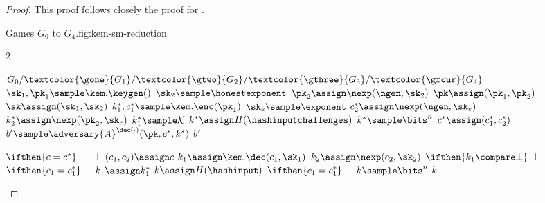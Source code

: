 \begin{proof}
    This proof follows closely the proof for \cite[Theorem 1]{PKC:GiaHeuPoe18}.

    \begin{gamefigure}{Games $G_0$ to $G_4$.}{fig:kem-sm-reduction}
        \begin{games}{2}
            \begin{gameenv}{\game $G_0 / \textcolor{\gone}{G_1} / \textcolor{\gtwo}{G_2} / \textcolor{\gthree}{G_3} / \textcolor{\gfour}{G_4}$}
                \State $\sk_1, \pk_1 \sample \kem.\keygen()$
                \State $\sk_2 \sample \honestexponent$
                \State $\pk_2 \assign \nexp(\ngen, \sk_2)$
                \State $\pk \assign (\pk_1, \pk_2)$
                \State $\sk \assign (\sk_1, \sk_2)$
                \State $k^*_1, c^*_1 \sample \kem.\enc(\pk_1)$
                \State $\sk_e \sample \exponent$
                \State $c^*_2 \assign \nexp(\ngen, \sk_e)$
                \State $k^*_2 \assign \nexp(\pk_2, \sk_e)$
                \BeginBox[draw=\gone]
                \State $k_1^* \sample \mathcal{K}$
                \EndBox
                \State $k^* \assign H(\hashinputchallenges)$
                \BeginBox[draw=\gtwo]
                \State  $k^* \sample \bits^{n}$
                \EndBox
                \State $c^* \assign (c_1^*, c_2^*)$
                \State $b' \sample \adversary{A}^{\dec(\cdot)}(\pk, c^*, k^*)$
                \State \Return $b'$
            \end{gameenv}
            \gamebreak
            \begin{gameenv}{\oracledec}
                \State $\ifthen{c = c^*}$
                    \State $\quad$ \Return $\bot$
                    \State $(c_1, c_2) \assign c$
                    \State $k_1 \assign \kem.\dec(c_1, \sk_1)$
                    \State $k_2 \assign \nexp(c_2, \sk_2)$
                    \State $\ifthen{k_1 \compare \bot}$
                        \State \quad \Return $\bot$
                        \BeginBox[draw=\gone]
                        \State $\ifthen{c_1 = c^*_1}$
                            \State $\quad k_1 \assign k_1^*$
                            \EndBox
                            \State $k \assign H(\hashinput)$
                            \BeginBox[draw=\gtwo]
                            \State $\ifthen{c_1 = c^*_1}$
                                \State $\quad k \sample \bits^{n}$
                                \EndBox
                                \State \Return $k$
                            \end{gameenv}
                        \end{games}
                    \end{gamefigure}


\end{proof}
